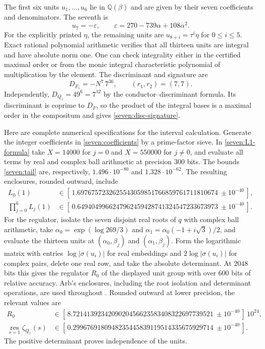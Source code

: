 \documentclass[11pt]{article}
\begin{document}
The first six units $u_1,\ldots,u_6$ lie in $\mathbb Q(\beta)$ and are
given by their seven coefficients and denominators.
The seventh is
\[
 u_7=-\varepsilon,\qquad
 \varepsilon=270-739\alpha+108\alpha^2.
 \tag{S19}\label{seven:base-unit}
\]
For the explicitly printed $\eta$, the remaining units are
$u_{8+i}=\tau^i\eta$ for $0\le i\le5$.
Exact rational polynomial arithmetic verifies that all thirteen units are
integral and have absolute norm one. One can check integrality either in
the certified maximal order or from the monic integral characteristic
polynomial of multiplication by the element. The discriminant and
signature are
\[
 D_{F_1}=-N^7\,7^{36},\qquad (r_1,r_2)=(7,7).
 \tag{S20}\label{seven:disc-signature}
\]
Independently, $D_{Q_1}=49^6=7^{12}$ by the conductor--discriminant
formula. Its discriminant is coprime to $D_F$, so the product of the
integral bases is a maximal order in the compositum and gives
\eqref{seven:disc-signature}.

Here are complete numerical specifications for the interval calculation.
Generate the integer coefficients in \eqref{seven:coefficients} by a
prime-factor sieve. In \eqref{seven:L1-formula} take $X=14000$ for $j=0$
and $X=550000$ for $j\ne0$, and evaluate all terms by real and complex
ball arithmetic at precision $300$ bits.
The bounds \eqref{seven:tail} are, respectively,
$1.496\cdot10^{-80}$ and $1.328\cdot10^{-62}$.
The resulting enclosures, rounded outward, include
\[
\begin{split}
 L_0(1)&\in
 [\,1.6976757232625543059851766859761711810674
       \ \pm 10^{-40}\,],\\
 \prod_{j=0}^6L_j(1)&\in
 [\,0.6494049966247962459428741324547233673973
       \ \pm 10^{-40}\,].
\end{split}
 \tag{S21}\label{seven:analytic-intervals}
\]
For the regulator, isolate the seven disjoint real roots of $q$ with
complex ball arithmetic, take
$\alpha_0=\exp(\log269/3)$ and
$\alpha_1=\alpha_0(-1+i\sqrt3)/2$, and evaluate the thirteen units at
$(\alpha_0,\beta_j)$ and $(\alpha_1,\beta_j)$.
Form the logarithmic matrix with entries $\log|\sigma(u_i)|$ for real
embeddings and $2\log|\sigma(u_i)|$ for complex pairs, delete one real
row, and take the absolute determinant.
At $2048$ bits this gives the regulator $R_0$ of the displayed unit group
with over $600$ bits of relative accuracy. Arb's enclosures, including
the root isolation and determinant operations, are used throughout
\cite{sevenJohansson2017}.
Rounded outward at lower precision, the relevant values are
\[
\begin{split}
 R_0&\in
 [\,8.7214139234209020456623583408322697739521
       \ \pm10^{-40}\,]\,10^{24},\\
 \operatorname*{res}_{s=1}\zeta_{Q_1}(s)
   &\in[\,0.2996769180948235445839119514335675929714
       \ \pm10^{-40}\,].
\end{split}
 \tag{S22}\label{seven:regulator-intervals}
\]
The positive determinant proves independence of the units.
\end{document}
